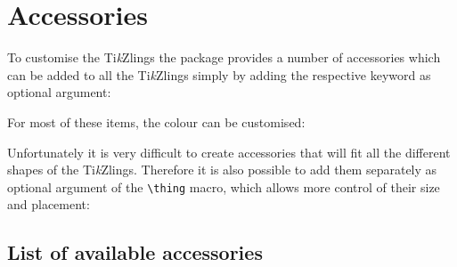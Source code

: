\documentclass[parskip=half]{scrartcl}
\newcommand{\tikzlings}{Ti\emph{k}Zlings\xspace}
\begin{document}
\begin{tcblisting}{}
\penguin[pupil=red]
\end{tcblisting}

\begin{tcblisting}{}
\penguin[3D]
\end{tcblisting}

\clearpage
\section{Accessories}

To customise the \tikzlings the package provides a number of accessories which can be added to all the \tikzlings simply by adding the respective keyword as optional argument:

\begin{tcblisting}{}
\bear[hat]
\end{tcblisting}
 
For most of these items, the colour can be customised:

\begin{tcblisting}{}
\koala[crown=orange!50!yellow]
\end{tcblisting}

Unfortunately it is very difficult to create accessories that will fit all the different shapes of the \tikzlings. Therefore it is also possible to add them separately as optional argument of the \lstinline|\thing| macro, which allows more control of their size and placement:

\begin{tcblisting}{}
\owl
\thing[tophat,scale=1.5,yshift=-0.6cm,xshift=-0.05cm]
\end{tcblisting}

\subsection{List of available accessories}
\end{document}
